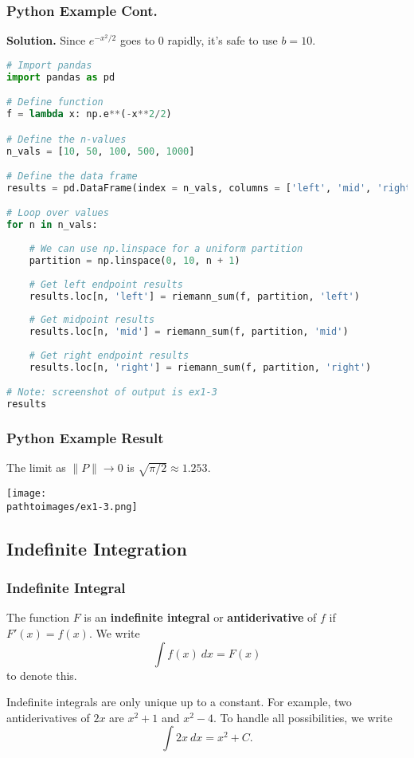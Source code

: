 \documentclass{beamer}
\newcommand{\pathtoimages}{/Users/charlesrambo/Desktop/Bootcamp24/Images}
\begin{document}
\begin{frame}[fragile]
\frametitle{Python Example Cont.}

{\bf Solution. } Since $e^{-x^2/2}$ goes to 0 rapidly, it's safe to use $b = 10$. 
\begin{lstlisting}[language=Python]
# Import pandas
import pandas as pd

# Define function
f = lambda x: np.e**(-x**2/2)

# Define the n-values
n_vals = [10, 50, 100, 500, 1000]

# Define the data frame
results = pd.DataFrame(index = n_vals, columns = ['left', 'mid', 'right'])

# Loop over values
for n in n_vals:
    
    # We can use np.linspace for a uniform partition
    partition = np.linspace(0, 10, n + 1)
    
    # Get left endpoint results
    results.loc[n, 'left'] = riemann_sum(f, partition, 'left')
    
    # Get midpoint results
    results.loc[n, 'mid'] = riemann_sum(f, partition, 'mid') 
 
    # Get right endpoint results
    results.loc[n, 'right'] = riemann_sum(f, partition, 'right')   

# Note: screenshot of output is ex1-3
results
\end{lstlisting}
\end{frame}

\begin{frame}[fragile]
\frametitle{Python Example Result}
The limit as $\| P\|\to 0$ is $\sqrt{\pi/2}\approx 1.253$.
\begin{center}
\texttt{[image: \\pathtoimages/ex1-3.png]}
\end{center}
\end{frame}

\subsection{Indefinite Integration} 


\begin{frame}
\frametitle{Indefinite Integral}

\begin{Definition}
The function $F$ is an {\bf indefinite integral} or {\bf antiderivative} of $f$ if $F'(x) = f(x)$. We write
$$
\int f(x)\ dx = F(x)
$$
to denote this.
\end{Definition}
Indefinite integrals are only unique up to a constant. For example, two antiderivatives of $2x$ are $x^2 +1$ and $x^2 - 4$. To handle all possibilities, we write
$$
\int 2x\ dx = x^2 + C.
$$
\end{frame}
\end{document}
